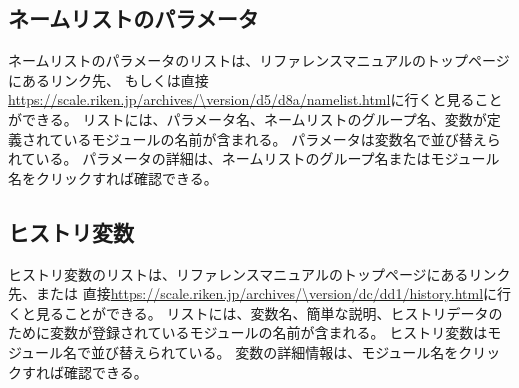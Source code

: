 \subsection{ネームリストのパラメータ}
ネームリストのパラメータのリストは、リファレンスマニュアルのトップページにあるリンク先、
もしくは直接\url{https://scale.riken.jp/archives/\version/d5/d8a/namelist.html}に行くと見ることができる。
リストには、パラメータ名、ネームリストのグループ名、変数が定義されているモジュールの名前が含まれる。
パラメータは変数名で並び替えられている。
パラメータの詳細は、ネームリストのグループ名またはモジュール名をクリックすれば確認できる。


\subsection{ヒストリ変数}
ヒストリ変数のリストは、リファレンスマニュアルのトップページにあるリンク先、または
直接\url{https://scale.riken.jp/archives/\version/dc/dd1/history.html}に行くと見ることができる。
リストには、変数名、簡単な説明、ヒストリデータのために変数が登録されているモジュールの名前が含まれる。
ヒストリ変数はモジュール名で並び替えられている。
変数の詳細情報は、モジュール名をクリックすれば確認できる。
